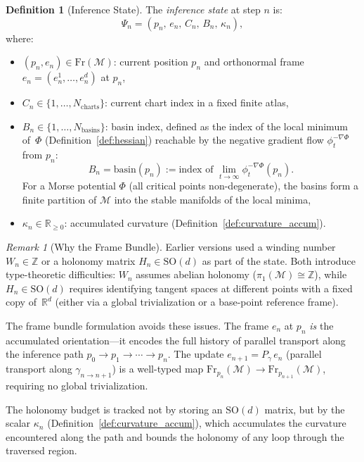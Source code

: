\documentclass[11pt,a4paper]{article}
\theoremstyle{definition}
\newtheorem{definition}[theorem]{Definition}
\theoremstyle{remark}
\newtheorem{remark}[theorem]{Remark}
\newcommand{\R}{\mathbb{R}}
\newcommand{\Z}{\mathbb{Z}}
\newcommand{\SO}{\mathrm{SO}}
\newcommand{\Fr}{\mathrm{Fr}}
\begin{document}
\begin{definition}[Inference State]\label{def:state}
The \emph{inference state} at step $n$ is:
\begin{equation}\label{eq:state}
    \Psi_n = (p_n,\, e_n,\, C_n,\, B_n,\, \kappa_n),
\end{equation}
where:
\begin{itemize}[nosep]
    \item $(p_n, e_n) \in \Fr(\mathcal{M})$: current position $p_n$ 
    and orthonormal frame $e_n = (e_n^1, \ldots, e_n^d)$ at $p_n$,
    \item $C_n \in \{1, \ldots, N_{\mathrm{charts}}\}$: current 
    chart index in a fixed finite atlas,
    \item $B_n \in \{1, \ldots, N_{\mathrm{basins}}\}$: basin 
    index, defined as the index of the local minimum of~$\Phi$ 
    (Definition~\ref{def:hessian}) reachable by the negative 
    gradient flow $\phi_t^{-\nabla\Phi}$ from $p_n$:
    \begin{equation}\label{eq:basin_def}
        B_n = \mathrm{basin}(p_n) := 
        \text{index of } \lim_{t \to \infty} 
        \phi_t^{-\nabla\Phi}(p_n).
    \end{equation}
    For a Morse potential $\Phi$ (all critical points non-degenerate), 
    the basins form a finite partition of $\mathcal{M}$ into the 
    stable manifolds of the local minima,
    \item $\kappa_n \in \R_{\geq 0}$: accumulated curvature 
    (Definition~\ref{def:curvature_accum}).
\end{itemize}
\end{definition}


\begin{remark}[Why the Frame Bundle]\label{rem:frame_bundle}
Earlier versions used a winding number $W_n \in \Z$ or a holonomy 
matrix $H_n \in \SO(d)$ as part of the state. Both introduce 
type-theoretic difficulties: $W_n$ assumes abelian holonomy 
($\pi_1(\mathcal{M}) \cong \Z$), while $H_n \in \SO(d)$ requires 
identifying tangent spaces at different points with a fixed copy 
of~$\R^d$ (either via a global trivialization or a base-point 
reference frame).

The frame bundle formulation avoids these issues. The frame 
$e_n$ at $p_n$ \emph{is} the accumulated orientation---it 
encodes the full history of parallel transport along the 
inference path $p_0 \to p_1 \to \cdots \to p_n$. The update 
$e_{n+1} = P_\gamma\,e_n$ (parallel transport along 
$\gamma_{n \to n+1}$) is a well-typed map 
$\Fr_{p_n}(\mathcal{M}) \to \Fr_{p_{n+1}}(\mathcal{M})$, 
requiring no global trivialization.

The holonomy budget is tracked not by storing an $\SO(d)$ 
matrix, but by the scalar $\kappa_n$ 
(Definition~\ref{def:curvature_accum}), which accumulates the 
curvature encountered along the path and bounds the holonomy 
of any loop through the traversed region.
\end{remark}
\end{document}
